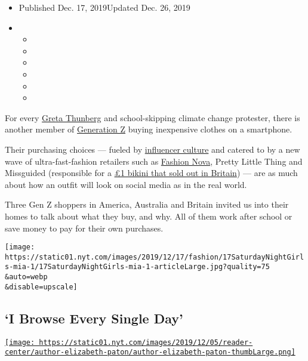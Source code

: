 \begin{itemize}
\item
  Published Dec. 17, 2019Updated Dec. 26, 2019
\item
  \begin{itemize}
  \item
  \item
  \item
  \item
  \item
  \item
  \end{itemize}
\end{itemize}

For every
\href{https://www.nytimes.com/2019/09/18/climate/greta-thunberg.html}{Greta
Thunberg} and school-skipping climate change protester, there is another
member of
\href{https://www.nytimes.com/2019/03/28/us/gen-z-in-their-words.html}{Generation
Z} buying inexpensive clothes on a smartphone.

Their purchasing choices --- fueled by
\href{https://www.nytimes.com/2019/07/16/technology/vidcon-social-media-influencers.html}{influencer
culture} and catered to by a new wave of ultra-fast-fashion retailers
such as
\href{https://www.nytimes.com/2019/12/16/business/fashion-nova-underpaid-workers.html}{Fashion
Nova}, Pretty Little Thing and Missguided (responsible for a
\href{https://www.theguardian.com/fashion/2019/jun/22/one-pound-bikini-missguided-fast-fashion-leaves-high-street-behind}{£1
bikini that sold out in Britain}) --- are as much about how an outfit
will look on social media as in the real world.

Three Gen Z shoppers in America, Australia and Britain invited us into
their homes to talk about what they buy, and why. All of them work after
school or save money to pay for their own purchases.

\texttt{[image: https://static01.nyt.com/images/2019/12/17/fashion/17SaturdayNightGirls-mia-1/17SaturdayNightGirls-mia-1-articleLarge.jpg?quality=75\\\&auto=webp\\\&disable=upscale]}

\hypertarget{i-browse-every-single-day}{%
\subsection{`I Browse Every Single
Day'}\label{i-browse-every-single-day}}

\href{https://www.nytimes.com/by/elizabeth-paton}{\texttt{[image: https://static01.nyt.com/images/2019/12/05/reader-center/author-elizabeth-paton/author-elizabeth-paton-thumbLarge.png]}}

